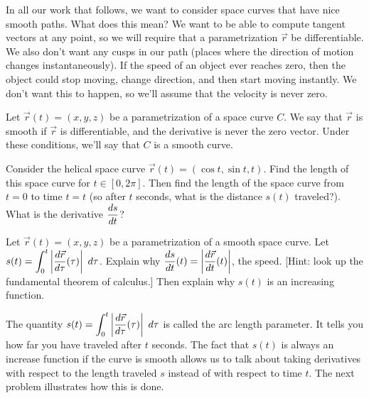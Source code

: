 In all our work that follows, we want to consider space curves that have nice smooth paths.  What does this mean?  We want to be able to compute tangent vectors at any point, so we will require that a parametrization $\vec r$ be differentiable.  We also don't want any cusps in our path (places where the direction of motion changes instantaneously). If the speed of an object ever reaches zero, then the object could stop moving, change direction, and then start moving instantly. We don't want this to happen, so we'll assume that the velocity is never zero.
\begin{definition}
 Let $\vec r(t)=(x,y,z)$ be a parametrization of a space curve $C$. We say that $\vec r$ is smooth if $\vec r$ is differentiable, and the derivative is never the zero vector. Under these conditions, we'll say that $C$ is a smooth curve. 
\end{definition}

\begin{problem}
 Consider the helical space curve $\vec r(t)=(\cos t, \sin t, t)$. Find the length of this space curve for $t\in[0,2\pi]$.  Then find the length of the space curve from $t=0$ to time $t=t$ (so after $t$ seconds, what is the distance $s(t)$ traveled?). What is the derivative $\displaystyle\frac{ds}{dt}$?
\end{problem}

\begin{problem}\label{fundamental theorem of calculus as it applies to arc length parameter}%
 Let $\vec r(t)=(x,y,z)$ be a parametrization of a smooth space curve. Let $\displaystyle s(t)=\int_0^t \left|\frac {d\vec r}{d\tau}(\tau) \right|\ d\tau$.  Explain why $\displaystyle\frac{ds}{dt}(t) = \left|\frac {d\vec r}{dt}(t) \right|$, the speed. [Hint: look up the fundamental theorem of calculus.] Then explain why $s(t)$ is an increasing function.
\end{problem}

The quantity $\displaystyle s(t)=\int_0^t \left|\frac {d\vec r}{d\tau}(\tau) \right|\ d\tau$ is called the arc length parameter.  It tells you how far you have traveled after $t$ seconds.  The fact that $s(t)$ is always an increase function if the curve is smooth allows us to talk about taking derivatives with respect to the length traveled $s$ instead of with respect to time $t$.  The next problem illustrates how this is done.

